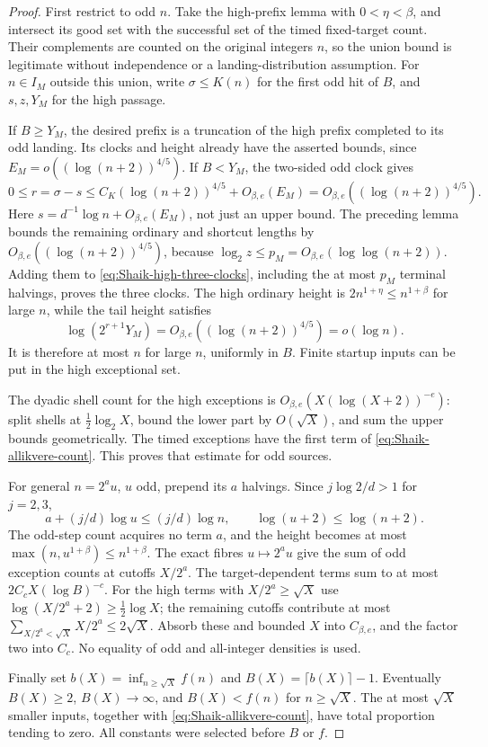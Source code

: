 \begin{proof}
First restrict to odd \(n\). Take the high-prefix lemma with
\(0<\eta<\beta\), and intersect its good set with the successful
set of the timed fixed-target count. Their complements are counted
on the original integers \(n\), so the union bound is legitimate
without independence or a landing-distribution assumption.
For \(n\in I_M\) outside this union, write \(\sigma\le K(n)\)
for the first odd hit of \(B\), and \(s,z,Y_M\) for the high passage.

If \(B\ge Y_M\), the desired prefix is a truncation of the high
prefix completed to its odd landing. Its clocks and height already
have the asserted bounds, since
\(E_M=o((\log(n+2))^{4/5})\).
If \(B<Y_M\), the two-sided odd clock gives
\[
 0\le r=\sigma-s\le
 C_K(\log(n+2))^{4/5}+O_{\beta,e}(E_M)
       =O_{\beta,e}((\log(n+2))^{4/5}).
\]
Here \(s=d^{-1}\log n+O_{\beta,e}(E_M)\), not just an upper bound.
The preceding lemma bounds the remaining ordinary and shortcut
lengths by \(O_{\beta,e}((\log(n+2))^{4/5})\), because
\(\log_2z\le p_M=O_{\beta,e}(\log\log(n+2))\).
Adding them to \eqref{eq:Shaik-high-three-clocks}, including the
at most \(p_M\) terminal halvings, proves the three clocks.
The high ordinary height is \(2n^{1+\eta}\le n^{1+\beta}\) for
large \(n\), while the tail height satisfies
\[
 \log(2^{r+1}Y_M)
      =O_{\beta,e}((\log(n+2))^{4/5})=o(\log n).
\]
It is therefore at most \(n\) for large \(n\), uniformly in \(B\).
Finite startup inputs can be put in the high exceptional set.

The dyadic shell count for the high exceptions is
\(O_{\beta,e}(X(\log(X+2))^{-e})\): split shells at
\(\tfrac12\log_2X\), bound the lower part by \(O(\sqrt X)\),
and sum the upper bounds geometrically. The timed exceptions have
the first term of \eqref{eq:Shaik-allikvere-count}.
This proves that estimate for odd sources.

For general \(n=2^a u\), \(u\) odd, prepend its \(a\) halvings.
Since \(j\log2/d>1\) for \(j=2,3\),
\[
 a+(j/d)\log u\le(j/d)\log n,\qquad
 \log(u+2)\le\log(n+2).
\]
The odd-step count acquires no term \(a\), and the height becomes
at most \(\max(n,u^{1+\beta})\le n^{1+\beta}\).
The exact fibres \(u\mapsto2^au\) give the sum of odd exception
counts at cutoffs \(X/2^a\).
The target-dependent terms sum to at most
\(2C_cX(\log B)^{-c}\). For the high terms with \(X/2^a\ge\sqrt X\)
use \(\log(X/2^a+2)\ge\tfrac12\log X\); the remaining cutoffs
contribute at most \(\sum_{X/2^a<\sqrt X}X/2^a\le2\sqrt X\).
Absorb these and bounded \(X\) into \(C_{\beta,e}\), and the factor
two into \(C_c\). No equality of odd and all-integer densities is used.

Finally set \(b(X)=\inf_{n\ge\sqrt X}f(n)\) and
\(B(X)=\lceil b(X)\rceil-1\). Eventually \(B(X)\ge2\),
\(B(X)\to\infty\), and \(B(X)<f(n)\) for \(n\ge\sqrt X\).
The at most \(\sqrt X\) smaller inputs, together with
\eqref{eq:Shaik-allikvere-count}, have total proportion tending to
zero. All constants were selected before \(B\) or \(f\).
\end{proof}

